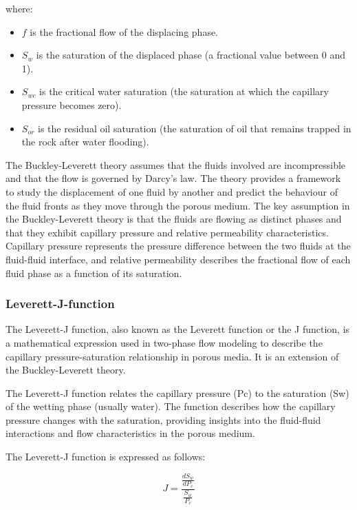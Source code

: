 		where:
		\begin{itemize}
			\item \( f \) is the fractional flow of the displacing phase.
			
			\item \( S_w \) is the saturation of the displaced phase (a fractional value between 0 and 1).
			
			\item \( S_{wc} \) is the critical water saturation (the saturation at which the capillary pressure becomes zero).
			
			\item \( S_{or} \) is the residual oil saturation (the saturation of oil that remains trapped in the rock after water flooding).
			
		\end{itemize}

		The Buckley-Leverett theory assumes that the fluids involved are incompressible and that the flow is governed by Darcy's law. The theory provides a framework to study the displacement of one fluid by another and predict the behaviour of the fluid fronts as they move through the porous medium.
		The key assumption in the Buckley-Leverett theory is that the fluids are flowing as distinct phases and that they exhibit capillary pressure and relative permeability characteristics. Capillary pressure represents the pressure difference between the two fluids at the fluid-fluid interface, and relative permeability describes the fractional flow of each fluid phase as a function of its saturation.
	
	\subsubsection{Leverett-J-function}
		The Leverett-J function, also known as the Leverett function or the J function, is a mathematical expression used in two-phase flow modeling to describe the capillary pressure-saturation relationship in porous media. It is an extension of the Buckley-Leverett theory. 

		The Leverett-J function relates the capillary pressure (Pc) to the saturation (Sw) of the wetting phase (usually water). The function describes how the capillary pressure changes with the saturation, providing insights into the fluid-fluid interactions and flow characteristics in the porous medium.
		
		The Leverett-J function is expressed as follows:

		\begin{equation}
			J = \frac{{\frac{{dS_w}}{{dP_c}}}}{{\frac{{S_w}}{{P_c}}}}
		\end{equation}

